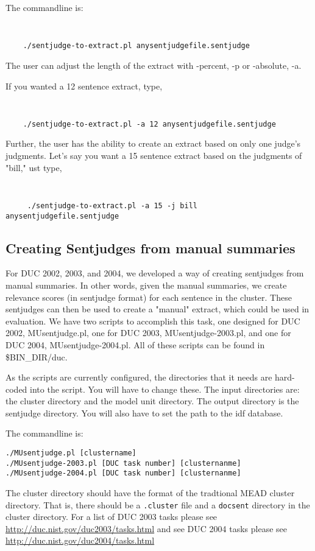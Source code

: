 \documentclass[10pt]{article}
\begin{document}
The commandline is:
{\tt
\begin{verbatim}
    ./sentjudge-to-extract.pl anysentjudgefile.sentjudge
\end{verbatim}
}

The user can adjust the length of the extract with -percent, -p or -absolute, -a.

If you wanted a 12 sentence extract, type, 
{\tt 
\begin{verbatim}
    ./sentjudge-to-extract.pl -a 12 anysentjudgefile.sentjudge
\end{verbatim}
}

Further, the user has the ability to create an extract based on only one judge's 
judgments.  Let's say you want a 15 sentence extract based on the judgments of "bill," 
ust type, {\tt
\begin{verbatim}
     ./sentjudge-to-extract.pl -a 15 -j bill anysentjudgefile.sentjudge
\end{verbatim}
}


\subsection{Creating Sentjudges from manual summaries}
For DUC 2002, 2003, and 2004, we developed a way of creating sentjudges from 
manual 
summaries.  In other words, given the manual summaries, we create relevance 
scores (in sentjudge format) for each sentence in the cluster.  These sentjudges can 
then be used to create a "manual" extract, 
which could be used in evaluation.  We have two scripts to accomplish this task, 
one designed for DUC 2002, MUsentjudge.pl, one for DUC 2003, 
MUsentjudge-2003.pl, and one for DUC 2004, MUsentjudge-2004.pl.
All of these scripts can be found in \$BIN\_DIR/duc.

As the scripts are currently configured, the directories that it needs
are hard-coded into the script.  You will have to change these.  The 
input directories are: the cluster directory and the model unit directory.  
The output directory is the sentjudge directory.  
You will also have to set the path to the idf database.

The commandline is: 

{\tt ./MUsentjudge.pl [clustername]}\\
{\tt ./MUsentjudge-2003.pl [DUC task number] [clusternanme]}\\
{\tt ./MUsentjudge-2004.pl [DUC task number] [clusternanme]}

The cluster directory should have the format of the tradtional MEAD
cluster directory.  That is, there should be a {\tt .cluster} file and
a {\tt docsent} directory in the cluster directory.  
For a list of DUC 2003 tasks please see \url{http://duc.nist.gov/duc2003/tasks.html}
and see DUC 2004 tasks please see \url{http://duc.nist.gov/duc2004/tasks.html}
\end{document}
